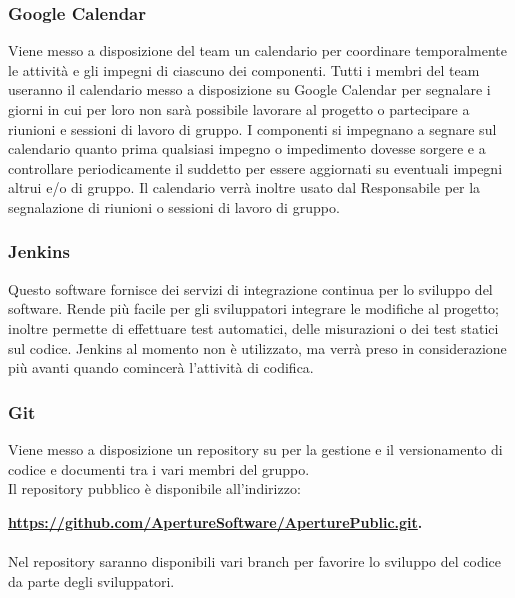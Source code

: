 \subsubsection{Google Calendar}
\label{4.2}
Viene messo a disposizione del team un calendario per coordinare temporalmente le attività e gli impegni di ciascuno dei componenti.
Tutti i membri del team useranno il calendario messo a disposizione su Google Calendar per segnalare i giorni in cui per loro non sarà possibile lavorare al progetto o partecipare a riunioni e sessioni di lavoro di gruppo. I componenti si impegnano a segnare sul calendario quanto prima qualsiasi impegno o impedimento dovesse sorgere e a controllare periodicamente il suddetto per essere aggiornati su eventuali impegni altrui e/o di gruppo.
Il calendario verrà inoltre usato dal Responsabile per la segnalazione di riunioni o sessioni di lavoro di gruppo.

\subsubsection{Jenkins}
\label{}
Questo software fornisce dei servizi di integrazione continua per lo sviluppo del software. Rende più facile per gli sviluppatori integrare le modifiche al progetto; inoltre permette di effettuare test automatici, delle misurazioni o dei test statici sul codice. Jenkins al momento non è utilizzato, ma verrà preso in considerazione più avanti quando comincerà l'attività di codifica.


\subsubsection{Git}
\label{4.3}
Viene messo a disposizione un repository  su  per la gestione e il versionamento di codice e documenti tra i vari membri del gruppo.\\
Il repository pubblico è disponibile all'indirizzo: \\
\begin{center}
\textbf{\url{https://github.com/ApertureSoftware/AperturePublic.git}.}
\end{center}

\paragraph{}
\label{4.4}
Nel repository saranno disponibili vari branch per favorire lo sviluppo del codice da parte degli sviluppatori.

